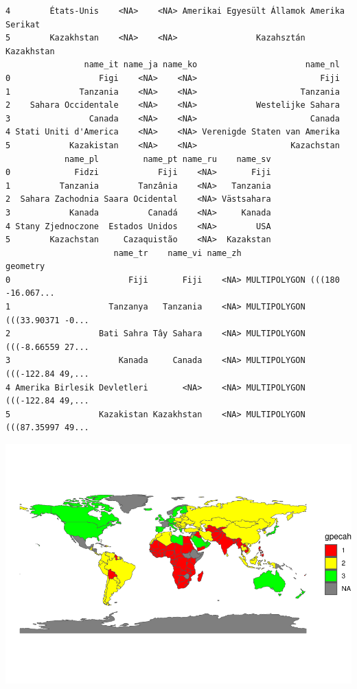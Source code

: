 \documentclass[
]{article}
\begin{document}
\begin{verbatim}
4        États-Unis    <NA>    <NA> Amerikai Egyesült Államok Amerika Serikat
5        Kazakhstan    <NA>    <NA>                Kazahsztán      Kazakhstan
                name_it name_ja name_ko                      name_nl
0                  Figi    <NA>    <NA>                         Fiji
1              Tanzania    <NA>    <NA>                     Tanzania
2    Sahara Occidentale    <NA>    <NA>            Westelijke Sahara
3                Canada    <NA>    <NA>                       Canada
4 Stati Uniti d'America    <NA>    <NA> Verenigde Staten van Amerika
5            Kazakistan    <NA>    <NA>                   Kazachstan
            name_pl         name_pt name_ru    name_sv
0             Fidzi            Fiji    <NA>       Fiji
1          Tanzania        Tanzânia    <NA>   Tanzania
2  Sahara Zachodnia Saara Ocidental    <NA> Västsahara
3            Kanada          Canadá    <NA>     Kanada
4 Stany Zjednoczone  Estados Unidos    <NA>        USA
5        Kazachstan     Cazaquistão    <NA>  Kazakstan
                      name_tr    name_vi name_zh                       geometry
0                        Fiji       Fiji    <NA> MULTIPOLYGON (((180 -16.067...
1                    Tanzanya   Tanzania    <NA> MULTIPOLYGON (((33.90371 -0...
2                  Bati Sahra Tây Sahara    <NA> MULTIPOLYGON (((-8.66559 27...
3                      Kanada     Canada    <NA> MULTIPOLYGON (((-122.84 49,...
4 Amerika Birlesik Devletleri       <NA>    <NA> MULTIPOLYGON (((-122.84 49,...
5                  Kazakistan Kazakhstan    <NA> MULTIPOLYGON (((87.35997 49...
\end{verbatim}

\includegraphics{Projet_files/figure-latex/unnamed-chunk-30-1.pdf}
\end{document}
